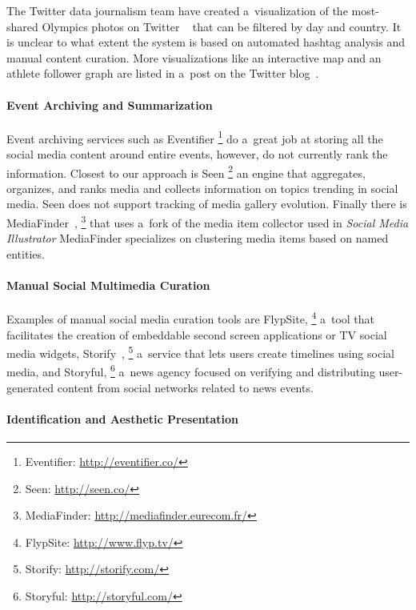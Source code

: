 \documentclass{sig-alternate-somus}
\newcommand{\inlinelistingsize}{\fontsize{8pt}{11pt}}
\let\oldurl\url
\renewcommand{\url}[1]{\inlinelistingsize\oldurl{#1}}
\begin{document}
The Twitter data journalism team have created a~visualization
of the most-shared Olympics photos on Twitter%
~\cite{schweitzer2014twitter} that can be
filtered by day and country.
It is unclear to what extent the system is based
on automated hashtag analysis and manual content curation.
More visualizations like an interactive map
and an athlete follower graph
are listed in a~post on the Twitter blog~\cite{rogers2014twitter}.

\paragraph{Event Archiving and Summarization}

Event archiving services such as Eventifier%
\footnote{Eventifier: \url{http://eventifier.co/}} 
do a~great job at storing all the social media content around
entire events, however, do not currently rank the information.
Closest to our approach is Seen%
\footnote{Seen: \url{http://seen.co/}}
an engine that aggregates, organizes, and ranks media
and collects information on topics trending in social media.
Seen does not support tracking of media gallery evolution.
Finally there is MediaFinder~\cite{troncy2013mediafinder},%
\footnote{MediaFinder: \url{http://mediafinder.eurecom.fr/}}
that uses a~fork of the media item collector
used in \emph{Social Media Illustrator}
MediaFinder specializes on clustering media items
based on named entities.

\paragraph{Manual Social Multimedia Curation}

Examples of manual social media curation tools are FlypSite,%
\footnote{FlypSite: \url{http://www.flyp.tv/}}
a~tool that facilitates the creation of embeddable
second screen applications or TV social media widgets,
Storify~\cite{fincham2011storify,atasoy2011storify},%
\footnote{Storify: \url{http://storify.com/}}
a~service that lets users create
timelines using social media, and Storyful,%
\footnote{Storyful: \url{http://storyful.com/}}
a~news agency focused on verifying and distributing
user-generated content from social networks related to news events.

\paragraph{Identification and Aesthetic Presentation}
\end{document}
